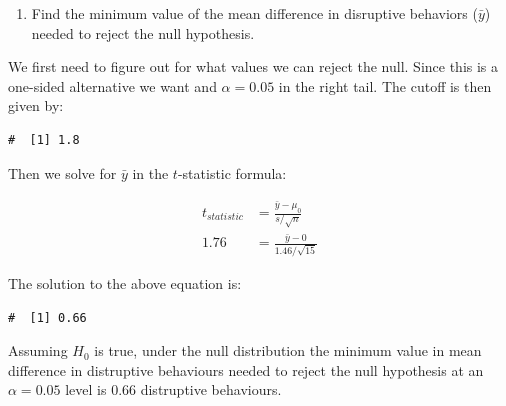 \documentclass[letterpaper,11pt,twoside,]{pinp}
\providecommand{\tightlist}{%
  \setlength{\itemsep}{0pt}\setlength{\parskip}{0pt}}
\begin{document}
\begin{enumerate}
\def\labelenumi{\alph{enumi}.}
\setcounter{enumi}{2}
\tightlist
\item
  Find the minimum value of the mean difference in disruptive behaviors
  (\(\bar{y}\)) needed to reject the null hypothesis.
\end{enumerate}

We first need to figure out for what values we can reject the null.
Since this is a one-sided alternative we want and \(\alpha=0.05\) in the
right tail. The cutoff is then given by:

\begin{Shaded}
\begin{Highlighting}[]
\OtherTok{\textless{}{-}} \NormalTok{(} \NormalTok{, } \NormalTok{))}
\end{Highlighting}
\end{Shaded}

\begin{ShadedResult}
\begin{verbatim}
#  [1] 1.8
\end{verbatim}
\end{ShadedResult}

Then we solve for \(\bar{y}\) in the \(t\)-statistic formula:

\begin{align*}
t_{statistic} & = \frac{\bar{y} - \mu_0}{s/\sqrt{n}} \\
1.76 & = \frac{\bar{y} - 0}{1.46/\sqrt{15}}
\end{align*}

The solution to the above equation is:

\begin{Shaded}
\begin{Highlighting}[]
\SpecialCharTok{*}\SpecialCharTok{/}
\end{Highlighting}
\end{Shaded}

\begin{ShadedResult}
\begin{verbatim}
#  [1] 0.66
\end{verbatim}
\end{ShadedResult}

Assuming \(H_0\) is true, under the null distribution the minimum value
in mean difference in distruptive behaviours needed to reject the null
hypothesis at an \(\alpha=0.05\) level is 0.66 distruptive behaviours.
\end{document}
